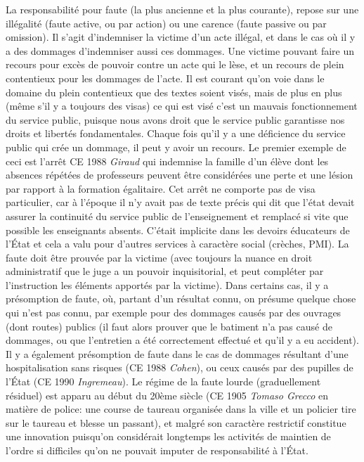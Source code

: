 \documentclass[math]{cours}
\begin{document}
La responsabilité pour faute (la plus ancienne et la plus courante), repose sur une illégalité (faute active, ou par action) ou une carence (faute passive ou par omission).
Il s'agit d'indemniser la victime d'un acte illégal, et dans le cas où il y a des dommages d'indemniser aussi ces dommages. Une victime pouvant faire un recours pour excès de pouvoir contre un acte qui le lèse, et un recours de plein contentieux pour les dommages de l'acte.
Il est courant qu'on voie dans le domaine du plein contentieux que des textes soient visés, mais de plus en plus (même s'il y a toujours des visas) ce qui est visé c'est un mauvais fonctionnement du service public, puisque nous avons droit que le service public garantisse nos droits et libertés fondamentales.
Chaque fois qu'il y a une déficience du service public qui crée un dommage, il peut y avoir un recours.
Le premier exemple de ceci est l'arrêt CE 1988 \emph{Giraud} qui indemnise la famille d'un élève dont les absences répétées de professeurs peuvent être considérées une perte et une lésion par rapport à la formation égalitaire.
Cet arrêt ne comporte pas de visa particulier, car à l'époque il n'y avait pas de texte précis qui dit que l'état devait assurer la continuité du service public de l'enseignement et remplacé si vite que possible les enseignants absents.
C'était implicite dans les devoirs éducateurs de l'État et cela a valu pour d'autres services à caractère social (crèches, PMI).
La faute doit être prouvée par la victime (avec toujours la nuance en droit administratif que le juge a un pouvoir inquisitorial, et peut compléter par l'instruction les éléments apportés par la victime).
Dans certains cas, il y a présomption de faute, où, partant d'un résultat connu, on présume quelque chose qui n'est pas connu, par exemple pour des dommages causés par des ouvrages (dont routes) publics (il faut alors prouver que le batiment n'a pas causé de dommages, ou que l'entretien a été correctement effectué et qu'il y a eu accident).
Il y a également présomption de faute dans le cas de dommages résultant d'une hospitalisation sans risques (CE 1988 \emph{Cohen}), ou ceux causés par des pupilles de l'État (CE 1990 \emph{Ingremeau}).
Le régime de la faute lourde (graduellement résiduel) est apparu au début du 20ème siècle (CE 1905 \emph{Tomaso Grecco} en matière de police: une course de taureau organisée dans la ville et un policier tire sur le taureau et blesse un passant), et malgré son caractère restrictif constitue une innovation puisqu'on considérait longtemps les activités de maintien de l'ordre si difficiles qu'on ne pouvait imputer de responsabilité à l'État.
\end{document}
